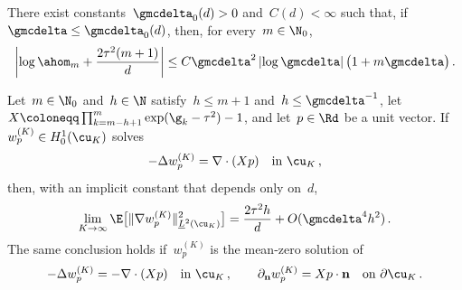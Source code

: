 \documentclass[11pt]{amsart}
\begin{document}
\begin{proposition}
	\label{p.sharp.asymptotic}
		There exist constants~$\gmcdelta_0(d)>0$ and~$C(d)<\infty$ such that, if~$\gmcdelta\leq\gmcdelta_0(d)$, then, for every~$m\in\N_0$,
	\begin{equation}
		\biggl|\log\ahom_m + \frac{2\tau^2 (m+1)}{d}\biggr| \leq C\gmcdelta^2\left|\log\gmcdelta\right|\bigl(1+m\gmcdelta\bigr)\,.
		\label{e.main.asymptotic}
	\end{equation}
\end{proposition}

\begin{lemma}
\label{l.laplacian.corrector.energy}
Let~$m\in\N_0$ and~$h\in\N$ satisfy~$h\leq m+1$ and~$h\leq\gmcdelta^{-1}$, let~$X\coloneqq\prod_{k=m-h+1}^m\exp(\g_k-\tau^2)-1$, and let~$p\in\Rd$ be a unit vector.  If~$w_p^{(K)}\in H_0^1(\cu_K)$ solves
\begin{equation*}
	-\Delta w_p^{(K)}=\nabla\cdot(Xp)
	\quad\text{in }\cu_K\,,
\end{equation*}
then, with an implicit constant that depends only on~$d$,
\begin{equation}
	\lim_{K\to\infty}
	\E\bigl[\|\nabla w_p^{(K)}\|_{\underline L^2(\cu_K)}^2\bigr]
	=
	\frac{2\tau^2h}{d}+O(\gmcdelta^4h^2)\,.
	\label{e.laplacian.corrector.energy}
\end{equation}
The same conclusion holds if~$w_p^{(K)}$ is the mean-zero solution of
\begin{equation*}
	-\Delta w_p^{(K)}=-\nabla\cdot(Xp)
	\quad\text{in }\cu_K\,,
	\qquad
	\partial_{\mathbf n}w_p^{(K)}=Xp\cdot\mathbf n
	\quad\text{on }\partial\cu_K\,.
\end{equation*}
\end{lemma}
\end{document}
